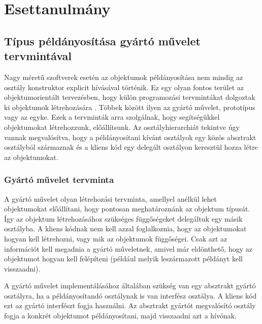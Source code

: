 \documentclass[a4paper,12pt]{report}
\begin{document}
\chapter{Esettanulmány}
\section{Típus példányosítása gyártó művelet tervmintával}
Nagy méretű szoftverek esetén az objektumok példányosítása nem mindig az osztály konstruktor explicit hívásával történik. Ez egy olyan fontos terület az objektumorientált tervezésben, hogy külön programozási tervmintákat dolgoztak ki objektumok létrehozására \cite{design_patterns}. Többek között ilyen az gyártó művelet, prototípus vagy az egyke. Ezek a tervminták arra szolgálnak, hogy segítségükkel objektumokat létrehozzunk, előállítsunk. Az osztályhierarchiát tekintve úgy vannak megvalósítva, hogy a példányosítani kívánt osztályok egy közös absztrakt osztályból származnak és a kliens kód egy delegált osztályon keresztül hozza létre az objektumokat.
\subsection{Gyártó művelet tervminta}
A gyártó művelet olyan létrehozási tervminta, amellyel anélkül lehet objektumokat előállítani, hogy pontosan meghatároznánk az objektum típusát. Így az objektum létrehozásához szükséges függőségeket delegáltuk egy másik osztályba. A kliens kódnak nem kell azzal foglalkoznia, hogy az objektumokat hogyan kell létrehozni, vagy mik az objektumok függőségei. Csak azt az információt kell megadnia a gyártó műveletnek, amivel már eldönthető, hogy az objektumot hogyan kell felépíteni (például melyik leszármazott példányt kell visszaadni).


A gyártó művelet implementálásához általában szükség van egy absztrakt gyártó osztályra, ha a példányosítandó osztálynak is van interfész osztálya. A kliens kód ezt az gyártó interfészt fogja használni. Az absztrakt gyártót megvalósító osztály  fogja a konkrét objektumot példányosítani, majd visszaadni azt a hívónak.
\end{document}
